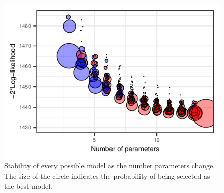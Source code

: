 \documentclass[letterpaper,9pt,twocolumn,twoside,]{pinp}
\begin{document}
\begin{figure}

{\centering \includegraphics{template_report_files/figure-latex/unnamed-chunk-6-1} 

}

\caption{\label{mplot:stab} Stability of every possible model as the number parameters change. The size of the circle indicates the probability of being selected as the best model.}\label{fig:unnamed-chunk-6}
\end{figure}
\end{document}
